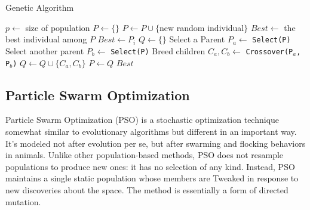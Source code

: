                 \begin{algorithm}[!htp]
                    \centering
                    \caption{Genetic Algorithm}
                    \begin{algorithmic}[1]
                        \State $p \gets$ size of population
                        \State $P \gets \{\}$
                            \State $P \gets P \cup \{$new random individual$\}$
                        \EndWhile
                        \State $Best \gets$ the best individual among $P$
                                    \State $Best \gets P_i$
                                \EndIf
                            \EndFor
                            \State $Q \gets \{\}$
                                \State Select a Parent $P_a \gets$ \texttt{Select(P)}
                                \State Select another parent $P_b \gets$ \texttt{Select(P)}
                                \State Breed children $C_a, C_b \gets$ \texttt{Crossover(P$_a$, P$_b$)}
                                \State $Q \gets Q \cup \{C_a, C_b\}$
                            \EndFor
                            \State $P \gets Q$
                        \EndWhile
                        \State \Return $Best$
                    \end{algorithmic}
                \end{algorithm}

            \subsection{Particle Swarm Optimization}
                Particle Swarm Optimization (PSO) is a stochastic optimization technique somewhat similar to evolutionary algorithms but different in an important way. It’s modeled not after evolution per se, but after swarming and flocking behaviors in animals. Unlike other population-based methods, PSO does not resample populations to produce new ones: it has no selection of any kind. Instead, PSO maintains a single static population whose members are Tweaked in response to new discoveries about the space. The method is essentially a form of directed mutation.

